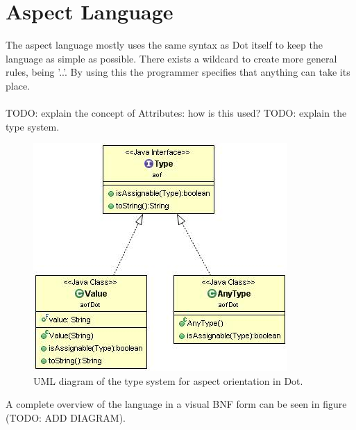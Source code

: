 \documentclass[a4paper]{report}
\begin{document}
\section{Aspect Language}
The aspect language mostly uses the same syntax as Dot itself to keep the language as simple as possible. There exists a wildcard to create more general rules, being '..'. By using this the programmer specifies that anything can take its place.\\
\\
TODO: explain the concept of Attributes: how is this used?
TODO: explain the type system.\\
\begin{figure}
\centering
\includegraphics[scale=0.7]{images/AOFDot/DotType.jpg}
\caption{UML diagram of the type system for aspect orientation in Dot.}
\label{fig:DotType}
\end{figure}

A complete overview of the language in a visual BNF form can be seen in figure (TODO: ADD DIAGRAM).
\end{document}
